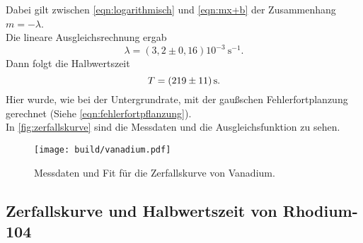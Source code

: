 Dabei gilt zwischen \autoref{eqn:logarithmisch} und \autoref{eqn:mx+b} der 
Zusammenhang $m = -\lambda$.
\\
Die lineare Ausgleichsrechnung ergab
\begin{equation}
	\lambda = (3,2 \pm 0,16) 10^{-3} \  \si{\second}^{-1}.
\end{equation}
\noindent Dann folgt die Halbwertszeit
\begin{equation}
	T = \SI{219\pm11}{\second}.
\end{equation}
Hier wurde, wie bei der Untergrundrate, mit der gaußschen Fehlerfortplanzung gerechnet (Siehe 
\autoref{eqn:fehlerfortpflanzung}).
\\
In \autoref{fig:zerfallskurve} sind die Messdaten und die Ausgleichsfunktion zu sehen.

\begin{figure}[H]
	\centering
	\texttt{[image: build/vanadium.pdf]}
	\caption{Messdaten und Fit für die Zerfallskurve von Vanadium.}
	\label{fig:zerfallskurve}
\end{figure}


\subsection{Zerfallskurve und Halbwertszeit von Rhodium-104}
\label{sec:aus:rhodium}

